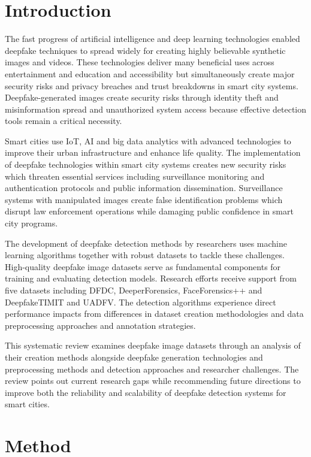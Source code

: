 \documentclass{article} %
\begin{document}
\newpage


\section{Introduction}

The fast progress of artificial intelligence and deep learning technologies enabled deepfake techniques to spread widely for creating highly believable synthetic images and videos. These technologies deliver many beneficial uses across entertainment and education and accessibility but simultaneously create major security risks and privacy breaches and trust breakdowns in smart city systems. Deepfake-generated images create security risks through identity theft and misinformation spread and unauthorized system access because effective detection tools remain a critical necessity. 

Smart cities use IoT, AI and big data analytics with advanced technologies to improve their urban infrastructure and enhance life quality. The implementation of deepfake technologies within smart city systems creates new security risks which threaten essential services including surveillance monitoring and authentication protocols and public information dissemination. Surveillance systems with manipulated images create false identification problems which disrupt law enforcement operations while damaging public confidence in smart city programs.

The development of deepfake detection methods by researchers uses machine learning algorithms together with robust datasets to tackle these challenges. High-quality deepfake image datasets serve as fundamental components for training and evaluating detection models. Research efforts receive support from five datasets including DFDC, DeeperForensics, FaceForensics++ and DeepfakeTIMIT and UADFV. The detection algorithms experience direct performance impacts from differences in dataset creation methodologies and data preprocessing approaches and annotation strategies.

This systematic review examines deepfake image datasets through an analysis of their creation methods alongside deepfake generation technologies and preprocessing methods and detection approaches and researcher challenges. The review points out current research gaps while recommending future directions to improve both the reliability and scalability of deepfake detection systems for smart cities.

\section{Method}
\end{document}
